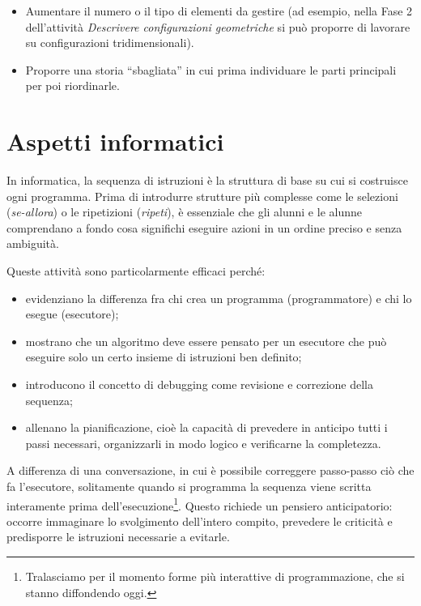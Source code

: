 \begin{itemize}
\item
  Aumentare il numero o il tipo di elementi da gestire (ad esempio, nella Fase 2 dell'attività \emph{Descrivere configurazioni geometriche} si può proporre di lavorare su configurazioni tridimensionali).
\item
  Proporre una storia ``sbagliata'' in cui prima individuare le parti principali per poi riordinarle.
\end{itemize}

\section{Aspetti informatici }\label{aspetti-informatici}

In informatica, la sequenza di istruzioni è la struttura di base su cui si costruisce ogni programma. Prima di introdurre strutture più complesse come le selezioni (\emph{se-allora}) o le ripetizioni (\emph{ripeti}), è essenziale che gli alunni e le alunne comprendano a fondo cosa significhi eseguire azioni in un ordine preciso e senza ambiguità.

Queste attività sono particolarmente efficaci perché:

\begin{itemize}
\item
  evidenziano la differenza fra chi crea un programma (programmatore) e chi lo esegue (esecutore);



\item mostrano che un algoritmo deve essere pensato per un esecutore che può eseguire solo un certo insieme di istruzioni ben definito;

\item
  introducono il concetto di debugging come revisione e correzione della sequenza;
\item
  allenano la pianificazione, cioè la capacità di prevedere in anticipo tutti i passi necessari, organizzarli in modo logico e verificarne la completezza.
\end{itemize}

A differenza di una conversazione, in cui è possibile correggere passo-passo ciò che fa l'esecutore, solitamente quando si programma la sequenza viene scritta interamente prima dell'esecuzione\footnote{
  Tralasciamo per il momento forme più interattive di programmazione, che si stanno diffondendo oggi.
  }. Questo richiede un pensiero anticipatorio: occorre immaginare lo svolgimento dell'intero compito, prevedere le criticità e predisporre le istruzioni necessarie a evitarle.

